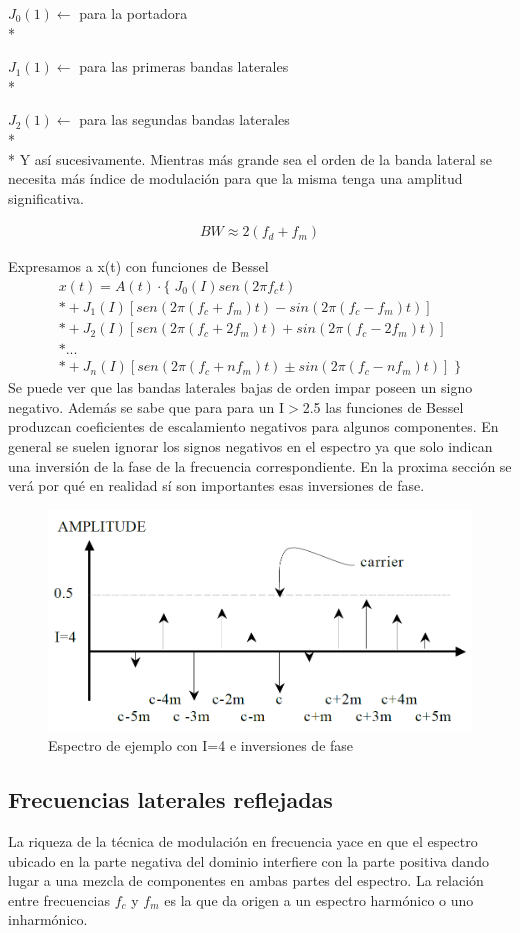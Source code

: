 \documentclass[assd_tp2_main.tex]{subfiles}
\begin{document}
$J_{0}(1)\longleftarrow$  para la portadora \\*

$J_{1}(1)\longleftarrow$  para las primeras bandas laterales \\*

$J_{2}(1)\longleftarrow$  para las segundas bandas laterales \\*
\\*
Y así sucesivamente.
Mientras más grande sea el orden de la banda lateral se necesita más índice de modulación para que la misma tenga una amplitud significativa.

\begin{eqnarray*}
\displaystyle BW \approx 2(f_d+f_m)
\end{eqnarray*}

Expresamos a x(t) con funciones de Bessel
\begin{eqnarray*}
\textstyle x(t)=A(t)\cdot \{ \; J_{0}(I)sen(2\pi f_c t) \\*
				+J_1(I)[sen(2\pi(f_c+f_m)t) - sin(2\pi(f_c-f_m)t)] \\*
				+J_2(I)[sen(2\pi(f_c+2f_m)t) + sin(2\pi(f_c-2f_m)t)] \\*
				... \\*
				+J_n(I)[sen(2\pi(f_c+n f_m)t) \pm sin(2\pi(f_c-n f_m)t)] \; \}
\end{eqnarray*}
Se puede ver que las bandas laterales bajas de orden impar poseen un signo negativo. Además se sabe que para para un I$>$2.5
las funciones de Bessel produzcan coeficientes de escalamiento negativos para algunos componentes.
En general se suelen ignorar los signos negativos en el espectro ya que solo indican una inversión de la fase de la frecuencia correspondiente. En la proxima sección se verá por qué en realidad sí son importantes esas inversiones de fase.
\begin{figure}[H]
\centering
\includegraphics[width=0.4\linewidth]{graficos/EJ4/signos.png}
\caption{Espectro de ejemplo con I=4 e inversiones de fase}
\label{fig:signos}
\end{figure}

\subsection*{Frecuencias laterales reflejadas}
La riqueza de la técnica de modulación en frecuencia yace en que el espectro ubicado en la parte negativa del dominio interfiere con la parte positiva dando lugar a una mezcla de componentes en ambas partes del espectro. La relación entre frecuencias $f_c$ y $f_m$ es la que da origen a un espectro harmónico o uno inharmónico.
\end{document}
